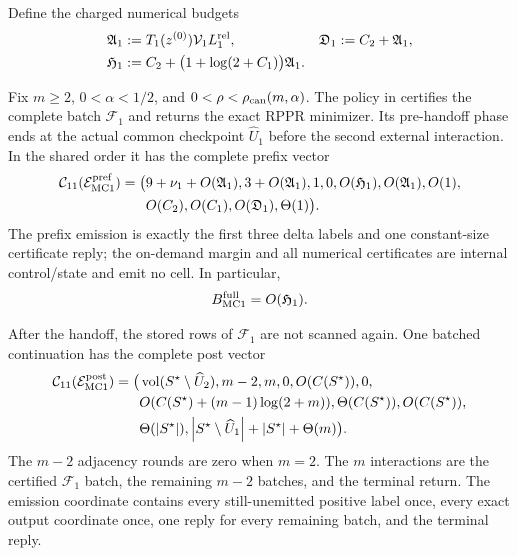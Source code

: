Define the charged numerical budgets
\begin{align}
 \mathfrak A_1&:=T_1(z^{(0)})\mathcal V_1L_1^{\rm rel},
 &\mathfrak D_1&:=C_2+\mathfrak A_1,
 \notag\\
\mathfrak H_1&:=C_2+
  \bigl(1+\log(2+C_1)\bigr)\mathfrak A_1.
 \label{eq:branch-caterpillar-first-layer-numerical-budgets}
\end{align}

\begin{theorem}
\label{thm:branch-caterpillar-first-layer-numerical-handoff}
Fix $m\geq2$, $0<\alpha<1/2$, and
$0<\rho<\rho_{\rm can}(m,\alpha)$.  The policy in
 certifies the
complete batch $\mathcal F_1$ and returns the exact RPPR minimizer.  Its
pre-handoff phase ends at the actual common checkpoint $\widehat U_1$ before
the second external interaction.  In the shared order it has the complete
prefix vector
\begin{equation}
 \begin{aligned}
 \mathcal C_{11}(\mathcal E_{\rm MC1}^{\rm pref})=\bigl(&
 9+\nu_1+O(\mathfrak A_1),
 3+O(\mathfrak A_1),1,0,O(\mathfrak H_1),
 O(\mathfrak A_1),O(1),\\
 &O(C_2),O(C_1),O(\mathfrak D_1),\Theta(1)\bigr).
 \end{aligned}
 \label{eq:branch-caterpillar-first-layer-numerical-prefix-eleven-vector}
\end{equation}
The prefix emission is exactly the first three delta labels and one
constant-size certificate reply; the on-demand margin and all numerical
certificates are internal control/state and emit no cell.  In particular,
\begin{equation}
 B_{\rm MC1}^{\rm full}=O(\mathfrak H_1).
 \label{eq:branch-caterpillar-first-layer-numerical-prefix-work}
\end{equation}

After the handoff, the stored rows of $\mathcal F_1$ are not scanned again.
One batched continuation has the complete post vector
\begin{equation}
 \begin{aligned}
 \mathcal C_{11}(\mathcal E_{\rm MC1}^{\rm post})=\bigl(&
 \operatorname{vol}(S^\star\setminus\widehat U_2),m-2,m,0,
 O(C(S^\star)),0,\\
 &O(C(S^\star)+(m-1)\log(2+m)),
 \Theta(C(S^\star)),O(C(S^\star)),\\
 &\Theta(\left\lvert S^\star \right\rvert),
 \left\lvert S^\star\setminus\widehat U_1 \right\rvert
 +\left\lvert S^\star \right\rvert+\Theta(m)\bigr).
 \end{aligned}
 \label{eq:branch-caterpillar-first-layer-numerical-post-eleven-vector}
\end{equation}
The $m-2$ adjacency rounds are zero when $m=2$.  The $m$ interactions are
the certified $\mathcal F_1$ batch, the remaining $m-2$ batches, and the
terminal return.  The emission coordinate contains every still-unemitted
positive label once, every exact output coordinate once, one reply for every
remaining batch, and the terminal reply.


\end{theorem}
